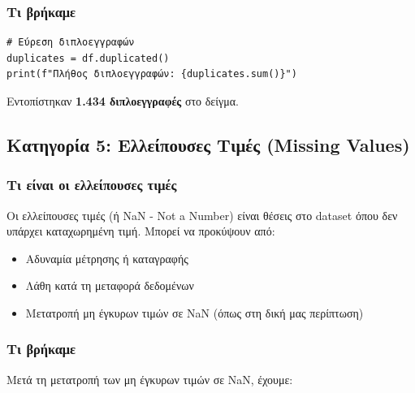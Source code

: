 \documentclass[12pt,a4paper]{article}
\begin{document}
\subsubsection{Τι βρήκαμε}

\begin{lstlisting}[caption={Εντοπισμός διπλοεγγραφών}]
# Εύρεση διπλοεγγραφών
duplicates = df.duplicated()
print(f"Πλήθος διπλοεγγραφών: {duplicates.sum()}")
\end{lstlisting}

\begin{successbox}[Αποτέλεσμα]
Εντοπίστηκαν \textbf{1.434 διπλοεγγραφές} στο δείγμα.
\end{successbox}

\subsection{Κατηγορία 5: Ελλείπουσες Τιμές (Missing Values)}

\subsubsection{Τι είναι οι ελλείπουσες τιμές}

\begin{infobox}
Οι ελλείπουσες τιμές (ή NaN - Not a Number) είναι θέσεις στο dataset όπου δεν υπάρχει καταχωρημένη τιμή. Μπορεί να προκύψουν από:
\begin{itemize}
    \item Αδυναμία μέτρησης ή καταγραφής
    \item Λάθη κατά τη μεταφορά δεδομένων
    \item Μετατροπή μη έγκυρων τιμών σε NaN (όπως στη δική μας περίπτωση)
\end{itemize}
\end{infobox}

\subsubsection{Τι βρήκαμε}

Μετά τη μετατροπή των μη έγκυρων τιμών σε NaN, έχουμε:
\end{document}
